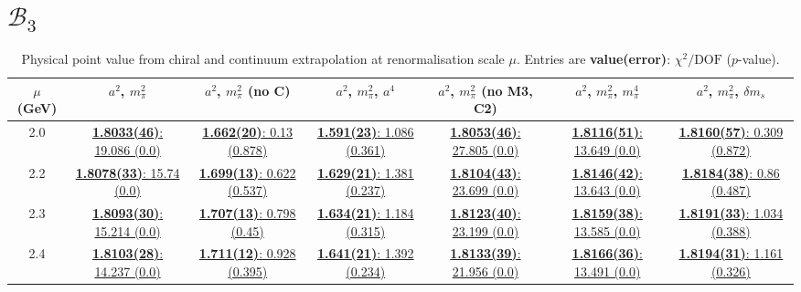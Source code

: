 \documentclass[12pt]{extarticle}
\begin{document}
\section{$\mathcal{B}_3$}
\begin{table}[h!]
\begin{center}
\begin{tabular}{|c|c|c|c|c|c|c|}
\hline
$\mu$ (GeV) & $a^2$, $m_\pi^2$& $a^2$, $m_\pi^2$ (no C)& $a^2$, $m_\pi^2$, $a^4$& $a^2$, $m_\pi^2$ (no M3, C2)& $a^2$, $m_\pi^2$, $m_\pi^4$& $a^2$, $m_\pi^2$, $\delta m_s$\\
\hline
2.0& \hyperlink{SSmPP/NPR/a2m2_20.pdf.1}{\textbf{1.8033(46)}: 19.086 (0.0)} & \hyperlink{SSmPP/NPR/a2m2noC_20.pdf.1}{\textbf{1.662(20)}: 0.13 (0.878)} & \hyperlink{SSmPP/NPR/a2a4m2_20.pdf.1}{\textbf{1.591(23)}: 1.086 (0.361)} & \hyperlink{SSmPP/NPR/a2m2mcut_20.pdf.1}{\textbf{1.8053(46)}: 27.805 (0.0)} & \hyperlink{SSmPP/NPR/a2m2m4_20.pdf.1}{\textbf{1.8116(51)}: 13.649 (0.0)} & \hyperlink{SSmPP/NPR/a2m2delm_20.pdf.1}{\textbf{1.8160(57)}: 0.309 (0.872)}\\
2.2& \hyperlink{SSmPP/NPR/a2m2_22.pdf.1}{\textbf{1.8078(33)}: 15.74 (0.0)} & \hyperlink{SSmPP/NPR/a2m2noC_22.pdf.1}{\textbf{1.699(13)}: 0.622 (0.537)} & \hyperlink{SSmPP/NPR/a2a4m2_22.pdf.1}{\textbf{1.629(21)}: 1.381 (0.237)} & \hyperlink{SSmPP/NPR/a2m2mcut_22.pdf.1}{\textbf{1.8104(43)}: 23.699 (0.0)} & \hyperlink{SSmPP/NPR/a2m2m4_22.pdf.1}{\textbf{1.8146(42)}: 13.643 (0.0)} & \hyperlink{SSmPP/NPR/a2m2delm_22.pdf.1}{\textbf{1.8184(38)}: 0.86 (0.487)}\\
2.3& \hyperlink{SSmPP/NPR/a2m2_23.pdf.1}{\textbf{1.8093(30)}: 15.214 (0.0)} & \hyperlink{SSmPP/NPR/a2m2noC_23.pdf.1}{\textbf{1.707(13)}: 0.798 (0.45)} & \hyperlink{SSmPP/NPR/a2a4m2_23.pdf.1}{\textbf{1.634(21)}: 1.184 (0.315)} & \hyperlink{SSmPP/NPR/a2m2mcut_23.pdf.1}{\textbf{1.8123(40)}: 23.199 (0.0)} & \hyperlink{SSmPP/NPR/a2m2m4_23.pdf.1}{\textbf{1.8159(38)}: 13.585 (0.0)} & \hyperlink{SSmPP/NPR/a2m2delm_23.pdf.1}{\textbf{1.8191(33)}: 1.034 (0.388)}\\
2.4& \hyperlink{SSmPP/NPR/a2m2_24.pdf.1}{\textbf{1.8103(28)}: 14.237 (0.0)} & \hyperlink{SSmPP/NPR/a2m2noC_24.pdf.1}{\textbf{1.711(12)}: 0.928 (0.395)} & \hyperlink{SSmPP/NPR/a2a4m2_24.pdf.1}{\textbf{1.641(21)}: 1.392 (0.234)} & \hyperlink{SSmPP/NPR/a2m2mcut_24.pdf.1}{\textbf{1.8133(39)}: 21.956 (0.0)} & \hyperlink{SSmPP/NPR/a2m2m4_24.pdf.1}{\textbf{1.8166(36)}: 13.491 (0.0)} & \hyperlink{SSmPP/NPR/a2m2delm_24.pdf.1}{\textbf{1.8194(31)}: 1.161 (0.326)}\\
\hline
\end{tabular}
\caption{Physical point value from chiral and continuum extrapolation at renormalisation scale $\mu$. Entries are \textbf{value(error)}: $\chi^2/\text{DOF}$ ($p$-value).}
\end{center}
\end{table}
\end{document}
